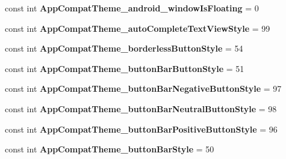 \begin{DoxyCompactItemize}
const int {\bfseries App\+Compat\+Theme\+\_\+android\+\_\+window\+Is\+Floating} = 0
\item 
\mbox{\label{class_sample_app_1_1_droid_1_1_resource_1_1_styleable_a0da731c2eefd0fef0166efc8ae500e71}} 
const int {\bfseries App\+Compat\+Theme\+\_\+auto\+Complete\+Text\+View\+Style} = 99
\item 
\mbox{\label{class_sample_app_1_1_droid_1_1_resource_1_1_styleable_abc4dc7ee94df73de7eaa2e442ae122e8}} 
const int {\bfseries App\+Compat\+Theme\+\_\+borderless\+Button\+Style} = 54
\item 
\mbox{\label{class_sample_app_1_1_droid_1_1_resource_1_1_styleable_a19949967f6a6786e6c4c36e00c0d14b6}} 
const int {\bfseries App\+Compat\+Theme\+\_\+button\+Bar\+Button\+Style} = 51
\item 
\mbox{\label{class_sample_app_1_1_droid_1_1_resource_1_1_styleable_acf23dd54d0a706cb14a9927a428940a7}} 
const int {\bfseries App\+Compat\+Theme\+\_\+button\+Bar\+Negative\+Button\+Style} = 97
\item 
\mbox{\label{class_sample_app_1_1_droid_1_1_resource_1_1_styleable_a2479a950d81a2351fcba31eb5ec05443}} 
const int {\bfseries App\+Compat\+Theme\+\_\+button\+Bar\+Neutral\+Button\+Style} = 98
\item 
\mbox{\label{class_sample_app_1_1_droid_1_1_resource_1_1_styleable_a959948fa22a1c1111f2f551b2affa73c}} 
const int {\bfseries App\+Compat\+Theme\+\_\+button\+Bar\+Positive\+Button\+Style} = 96
\item 
\mbox{\label{class_sample_app_1_1_droid_1_1_resource_1_1_styleable_a17c8f1a649f31e9338867b0b619d61f6}} 
const int {\bfseries App\+Compat\+Theme\+\_\+button\+Bar\+Style} = 50
\item 
\mbox{\label{class_sample_app_1_1_droid_1_1_resource_1_1_styleable_aeb2cbd9142872c9a34499697219421ed}} 

\end{DoxyCompactItemize}
